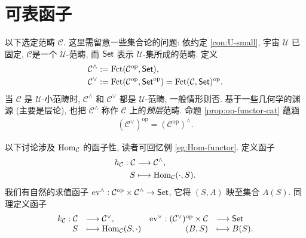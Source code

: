 \section{可表函子}\label{sec:representable-functors}
以下选定范畴 $\mathcal{C}$. 这里需留意一些集合论的问题: 依约定 \ref{con:U-small}, 宇宙 $\mathcal{U}$ 已固定, $\mathcal{C} $是一个 $\mathcal{U}$-范畴, 而 $\mathsf{Set}$ 表示 $\mathcal{U}$-集所成的范畴. 定义
\begin{align*}
	\mathcal{C}^\wedge & := \text{Fct}(\mathcal{C}^\text{op}, \mathsf{Set}), \\
	\mathcal{C}^\vee & := \text{Fct}(\mathcal{C}^\text{op}, \mathsf{Set}^\text{op}) = \text{Fct}(\mathcal{C}, \mathsf{Set})^\text{op}.
\end{align*}
当 $\mathcal{C}$ 是 $\mathcal{U}$-小范畴时, $\mathcal{C}^\wedge$ 和 $\mathcal{C}^\vee$ 都是 $\mathcal{U}$-范畴, 一般情形则否. 基于一些几何学的渊源 (主要是层论), 也把 $\mathcal{C}^\wedge$ 称作 $\mathcal{C}$ 上的\emph{预层}范畴. 命题 \ref{prop:op-functor-cat} 蕴涵
\begin{gather}\label{eqn:Yoneda-cat-duality}
	(\mathcal{C}^\vee)^\text{op} = (\mathcal{C}^\text{op})^\wedge .
\end{gather}

以下讨论涉及 $\operatorname{Hom}_{\mathcal{C}}$ 的函子性, 读者可回忆例 \ref{eg:Hom-functor}. 定义函子
\begin{align*}
	h_{\mathcal{C}}: \mathcal{C} & \longrightarrow \mathcal{C}^\wedge, \\
	S & \longmapsto \operatorname{Hom}_{\mathcal{C}}(\cdot, S).
\end{align*}
我们有自然的求值函子 $\text{ev}^\wedge: \mathcal{C}^\text{op} \times \mathcal{C}^\wedge \to \mathsf{Set}$, 它将 $(S, A)$ 映至集合 $A(S)$. 同理定义函子
\[\begin{array}{rlrl}
	k_{\mathcal{C}}: \mathcal{C} & \longrightarrow \mathcal{C}^\vee, & \text{ev}^\vee: (\mathcal{C}^\vee)^\text{op} \times \mathcal{C} & \longrightarrow \mathsf{Set} \\
	S & \longmapsto \operatorname{Hom}_{\mathcal{C}}(S, \cdot) & (B, S) & \longmapsto B(S).
\end{array}\]


